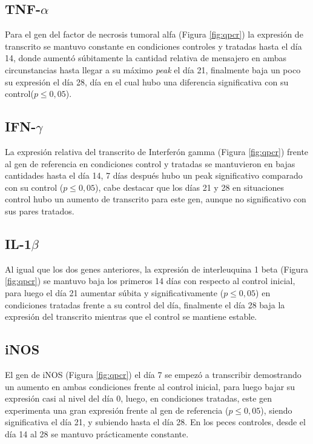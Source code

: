 \documentclass[12pt,letterpaper,oneside]{scrbook}
\begin{document}
\subsection{TNF-$\alpha$}

Para el gen del factor de necrosis tumoral alfa (Figura
\ref{fig:qpcr}) la expresión de transcrito se
mantuvo constante en condiciones controles y tratadas hasta el día 14,
donde aumentó súbitamente la cantidad relativa de mensajero en ambas
circunstancias hasta llegar a su máximo \emph{peak} el día 21,
finalmente baja un poco su expresión el día 28, día en el cual hubo una
diferencia significativa con su control(\(p \leq 0,05\)).

\subsection{IFN-$\gamma$}

La expresión relativa del transcrito de Interferón gamma (Figura
\ref{fig:qpcr}) frente al gen de referencia en
condiciones control y tratadas se mantuvieron en bajas cantidades hasta
el día 14, 7 días después hubo un peak significativo comparado con su
control (\(p \leq 0,05\)), cabe destacar que los días 21 y 28 en
situaciones control hubo un aumento de transcrito para este gen, aunque
no significativo con sus pares tratados.

\subsection{IL-1$\beta$}

Al igual que los dos genes anteriores, la expresión de interleuquina 1
beta (Figura \ref{fig:qpcr}) se mantuvo baja los
primeros 14 días con respecto al control inicial, para luego el día 21
aumentar súbita y significativamente (\(p \leq 0,05\)) en condiciones
tratadas frente a su control del día, finalmente el día 28 baja la
expresión del transcrito mientras que el control se mantiene estable.

\subsection{iNOS}

El gen de iNOS (Figura \ref{fig:qpcr}) el día 7 se
empezó a transcribir demostrando un aumento en ambas condiciones frente
al control inicial, para luego bajar su expresión casi al nivel del día
0, luego, en condiciones tratadas, este gen experimenta una gran
expresión frente al gen de referencia (\(p \leq 0,05\)), siendo
significativa el día 21, y subiendo hasta el día 28. En los peces
controles, desde el día 14 al 28 se mantuvo prácticamente constante.
\end{document}
